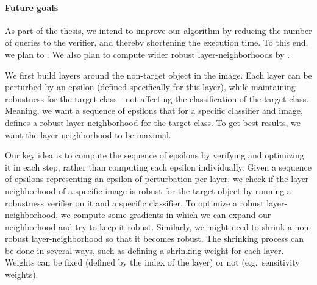 \paragraph{Future goals}
As part of the thesis, we intend to improve our algorithm by reducing the number of queries to the verifier, and thereby shortening the execution time. To this end, we plan to .
We also plan to compute wider robust layer-neighborhoods by .


We first build layers around the non-target object in the image.
Each layer can be perturbed by an epsilon (defined specifically for this layer), while maintaining robustness for the target class - not affecting the classification of the target class.
Meaning, we want a sequence of epsilons that for a specific classifier and image, defines a robust layer-neighborhood for the target class.
To get best results, we want the layer-neighborhood to be maximal.

Our key idea is to compute the sequence of epsilons by verifying and optimizing it in each step, rather than computing each epsilon individually.
Given a sequence of epsilons representing an epsilon of perturbation per layer, we check if the layer-neighborhood of a specific image is robust for the target object by running a robustness verifier on it and a specific classifier.
To optimize a robust layer-neighborhood, we compute some gradients in which we can expand our neighborhood and try to keep it robust.
Similarly, we might need to shrink a non-robust layer-neighborhood so that it becomes robust.
The shrinking process can be done in several ways, such as defining a shrinking weight for each layer.
Weights can be fixed (defined by the index of the layer) or not (e.g.\ sensitivity weights).